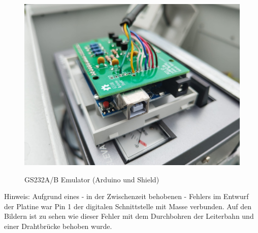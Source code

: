 \begin{figure}[H]
	\centering
	\includegraphics[width=15cm]{../ref/PCB_Seite_GS232.jpeg}
	\label{fig:ardushieldbestueckt}
	\caption{GS232A/B Emulator (Arduino und Shield)}
\end{figure}

Hinweis: Aufgrund eines - in der Zwischenzeit behobenen - Fehlers im Entwurf der Platine war Pin 1 der digitalen Schnittstelle mit Masse verbunden. Auf den Bildern ist zu sehen wie dieser Fehler mit dem Durchbohren der Leiterbahn und einer Drahtbrücke behoben wurde.